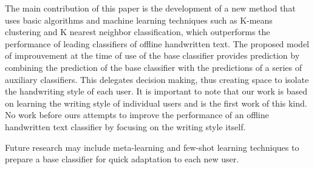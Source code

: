\documentclass{article}
\begin{document}
The main contribution of this paper is the development of a new method that uses basic algorithms and machine learning techniques such as K-means clustering 
and K nearest neighbor classification, which outperforms the performance of leading classifiers of offline handwritten text. 
The proposed model of improuvement at the time of use of the base classifier provides prediction by combining the prediction of the base classifier 
with the predictions of a series of auxiliary classifiers. 
This delegates decision making, thus creating space to isolate the handwriting style of each user. 
It is important to note that our work is based on learning the writing style of individual users and is the first work of this kind. 
No work before ours attempts to improve the performance of an offline handwritten text classifier by focusing on the writing style itself. 

Future research may include meta-learning and few-shot learning techniques to prepare a base classifier for quick adaptation to each new user. 

\small
\end{document}
